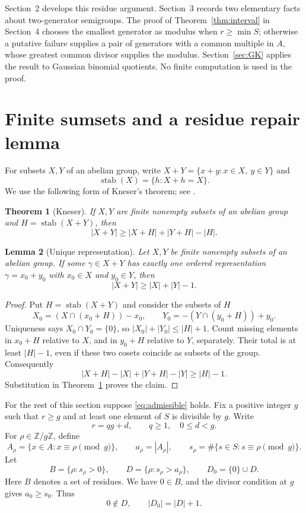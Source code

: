 \documentclass[11pt]{article}
\newtheorem{theorem}{Theorem}[section]
\newtheorem{lemma}[theorem]{Lemma}
\theoremstyle{definition}
\theoremstyle{remark}
\newcommand{\ZZ}{\mathbb Z}
\DeclareMathOperator{\stab}{stab}
\begin{document}
Section~2 develops this residue argument. Section~3 records two
elementary facts about two-generator semigroups. The proof of
Theorem~\ref{thm:interval} in Section~4 chooses the smallest generator
as modulus when $r\geq\min S$; otherwise a putative failure supplies
a pair of generators with a common multiple in $A$, whose greatest
common divisor supplies the modulus. Section~\ref{sec:GK} applies the
result to Gaussian binomial quotients. No finite computation is used
in the proof.

\section{Finite sumsets and a residue repair lemma}

For subsets $X,Y$ of an abelian group, write
$X+Y=\{x+y:x\in X,\ y\in Y\}$ and
\[
 \stab(X)=\{h:X+h=X\}.
\]
We use the following form of Kneser's theorem; see
\cite[Theorem~1]{DeVos}.

\begin{theorem}[Kneser]\label{thm:Kneser}
If $X,Y$ are finite nonempty subsets of an abelian group and
$H=\stab(X+Y)$, then
\[
 |X+Y|\geq |X+H|+|Y+H|-|H|.
\]
\end{theorem}

\begin{lemma}[Unique representation]\label{lem:unique}
Let $X,Y$ be finite nonempty subsets of an abelian group. If some
$\gamma\in X+Y$ has exactly one ordered representation
$\gamma=x_0+y_0$ with $x_0\in X$ and $y_0\in Y$, then
\[
 |X+Y|\geq |X|+|Y|-1.
\]
\end{lemma}

\begin{proof}
Put $H=\stab(X+Y)$ and consider the subsets of $H$
\[
 X_0=(X\cap(x_0+H))-x_0,
 \qquad
 Y_0=-(Y\cap(y_0+H))+y_0.
\]
Uniqueness says $X_0\cap Y_0=\{0\}$, so
$|X_0|+|Y_0|\leq |H|+1$. Count missing elements in $x_0+H$ relative
to $X$, and in $y_0+H$ relative to $Y$, separately. Their total is at
least $|H|-1$, even if these two cosets coincide as subsets of the group.
Consequently
\[
 |X+H|-|X|+|Y+H|-|Y|\geq |H|-1.
\]
Substitution in Theorem~\ref{thm:Kneser} proves the claim.
\end{proof}

For the rest of this section suppose \eqref{eq:admissible} holds. Fix
a positive integer $g$ such that $r\geq g$ and at least one element of
$S$ is divisible by $g$. Write
\begin{equation}\label{eq:division}
 r=qg+d,\qquad q\geq1,\quad 0\leq d<g.
\end{equation}
For $\rho\in\ZZ/g\ZZ$, define
\[
 A_\rho=\{x\in A:x\equiv\rho\pmod g\},\qquad
 a_\rho=|A_\rho|,\qquad
 s_\rho=\#\{s\in S:s\equiv\rho\pmod g\}.
\]
Let
\begin{equation}\label{eq:BD}
 B=\{\rho:s_\rho>0\},\qquad
 D=\{\rho:s_\rho>a_\rho\},\qquad
 D_0=\{0\}\cup D.
\end{equation}
Here $B$ denotes a set of residues. We have $0\in B$, and the divisor
condition at $g$ gives $a_0\geq s_0$. Thus
\begin{equation}\label{eq:zero-not-D}
 0\notin D,\qquad |D_0|=|D|+1.
\end{equation}
\end{document}
